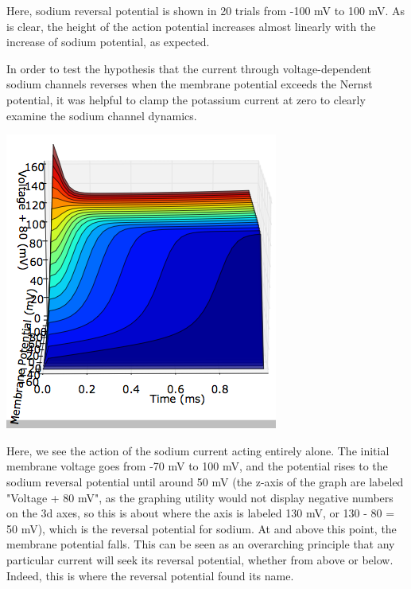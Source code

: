 \documentclass[12pt]{article}
\begin{document}
Here, sodium reversal potential is shown in 20 trials from -100 mV to 100 mV.  As is clear, the height of the action potential increases almost linearly with the increase of sodium potential, as expected.  

In order to test the hypothesis that the current through voltage-dependent sodium channels reverses when the membrane potential exceeds the Nernst potential, it was helpful to clamp the potassium current at zero to clearly examine the sodium channel dynamics.  

\includegraphics[scale=0.65]{nareversal-to-voltage.png}

Here, we see the action of the sodium current acting entirely alone.  The initial membrane voltage goes from -70 mV to 100 mV, and the potential rises to the sodium reversal potential until around 50 mV (the z-axis of the graph are labeled "Voltage + 80 mV", as the graphing utility would not display negative numbers on the 3d axes, so this is about where the axis is labeled 130 mV, or 130 - 80 = 50 mV), which is the reversal potential for sodium.  At and above this point, the membrane potential falls.  This can be seen as an overarching principle that any particular current will seek its reversal potential, whether from above or below.  Indeed, this is where the reversal potential found its name.  
\end{document}
